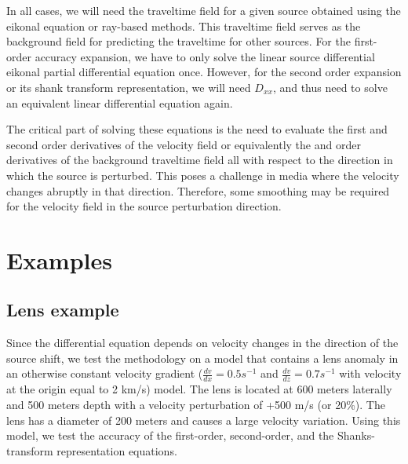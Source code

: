 In all cases, we will need the traveltime field for a given source obtained using the eikonal equation or ray-based methods. This
traveltime field serves as the background field for predicting the traveltime for other sources.
For the first-order accuracy expansion, we have to only solve the linear source differential eikonal partial differential equation once.
However, for the second order expansion or its shank transform representation, we will need $D_{xx}$, and thus need to solve an
equivalent linear differential equation again. 

The critical part of solving these equations is the need to evaluate
the first and second order derivatives of the velocity field or
equivalently the   and 
order derivatives of the background traveltime field all
with respect to the direction in which the source is perturbed. This
poses a challenge in media where the velocity changes abruptly in that
direction.  Therefore, some smoothing may be required for the velocity
field in the source perturbation direction.

\section{Examples}

\subsection{Lens example}


Since the differential equation depends on velocity changes in the
direction of the source shift, we test the methodology on a model that
contains a lens anomaly in an otherwise constant velocity gradient
($\frac{dv}{dx}=0.5 s^{-1}$ and $\frac{dv}{dz}=0.7 s^{-1}$ with
velocity at the origin equal to 2 km/s) model.  The lens is located at
600 meters laterally and 500 meters depth with a velocity perturbation
of +500 m/s (or 20\%). The lens has a diameter of 200 meters and
causes a large velocity variation. Using this model, we test the
accuracy of the first-order, second-order, and the Shanks-transform
representation equations.

